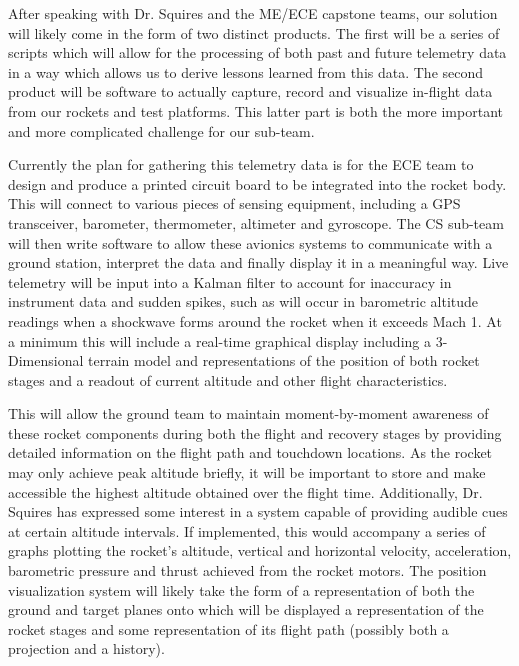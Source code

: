 \documentclass[onecolumn, draftclsnofoot,10pt, compsoc]{IEEEtran}
\begin{document}
After speaking with Dr. Squires and the ME/ECE capstone teams, our solution will likely come in the form of two distinct products. 
The first will be a series of scripts which will allow for the processing of both past and future telemetry data in a way which allows us to derive lessons learned from this data. 
The second product will be software to actually capture, record and visualize in-flight data from our rockets and test platforms. 
This latter part is both the more important and more complicated challenge for our sub-team.

Currently the plan for gathering this telemetry data is for the ECE team to design and produce a printed circuit board to be integrated into the rocket body. 
This will connect to various pieces of sensing equipment, including a GPS transceiver, barometer, thermometer, altimeter and gyroscope. 
The CS sub-team will then write software to allow these avionics systems to communicate with a ground station, interpret the data and finally display it in a meaningful way.
Live telemetry will be input into a Kalman filter to account for inaccuracy in instrument data and sudden spikes, such as will occur in barometric altitude readings when a shockwave forms around the rocket when it exceeds Mach 1.  
At a minimum this will include a real-time graphical display including a 3-Dimensional terrain model and representations of the position of both rocket stages and a readout of current altitude and other flight characteristics.

This will allow the ground team to maintain moment-by-moment awareness of these rocket components during both the flight and recovery stages by providing detailed information on the flight path and touchdown locations.
As the rocket may only achieve peak altitude briefly, it will be important to store and make accessible the highest altitude obtained over the flight time. 
Additionally, Dr. Squires has expressed some interest in a system capable of providing audible cues at certain altitude intervals.
If implemented, this would accompany a series of graphs plotting the rocket’s altitude, vertical and horizontal velocity, acceleration, barometric pressure and thrust achieved from the rocket motors.
The position visualization system will likely take the form of a representation of both the ground and target planes onto which will be displayed a representation of the rocket stages and some representation of its flight path (possibly both a projection and a history).

\end{document}
